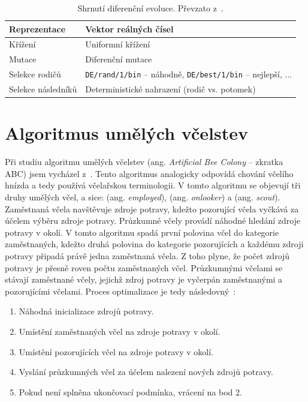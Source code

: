 \begin{table}[htp]
\centering
\caption{Shrnutí diferenční evoluce. Převzato z~\cite{introductionEvo}.}
\label{tab:DE}
\begin{tabular}{|l|l|}
\hline
Reprezentace & Vektor reálných čísel \\ \hline
Křížení & Uniformní křížení\\ \hline
Mutace & Diferenční mutace \\ \hline
Selekce rodičů & \texttt{DE/rand/1/bin} -- náhodně, \texttt{DE/best/1/bin} -- nejlepší, ... \\ \hline
Selekce následníků & Deterministické nahrazení (rodič vs. potomek) \\ \hline
\end{tabular}
\end{table}



\section{Algoritmus umělých včelstev}
Při studiu algoritmu umělých včelstev (ang. \emph{Artificial Bee Colony} -- zkratka ABC) jsem vycházel z~\cite{ABC, ABC_TSP}. Tento algoritmus analogicky odpovídá chování včelího hnízda a tedy používá včelařskou terminologii. V tomto algoritmu se objevují tři druhy umělých včel, a sice:  (ang. \emph{employed}),  (ang. \emph{onlooker}) a  (ang. \emph{scout}). Zaměstnaná včela navštěvuje zdroje potravy, kdežto pozorující včela vyčkává za účelem výběru zdroje potravy. Průzkumné včely provádí náhodné hledání zdroje potravy v okolí. V tomto algoritmu spadá první polovina včel do kategorie zaměstnaných, kdežto druhá polovina do kategorie pozorujících a každému zdroji potravy připadá právě jedna zaměstnaná včela. Z toho plyne, že počet zdrojů potravy je přesně roven počtu zaměstnaných včel. Průzkumnými včelami se stávají zaměstnané včely, jejichž zdroj potravy je vyčerpán zaměstnanými a pozorujícími včelami. Proces optimalizace je tedy následovný~\cite{ABC}:

\begin{enumerate}
    \item Náhodná inicializace zdrojů potravy.
    \item Umístění zaměstnaných včel na zdroje potravy v okolí.
    \item Umístění pozorujících včel na zdroje potravy v okolí.
    \item Vyslání průzkumných včel za účelem nalezení nových zdrojů potravy.
    \item Pokud není splněna ukončovací podmínka, vrácení na bod 2.
\end{enumerate}

